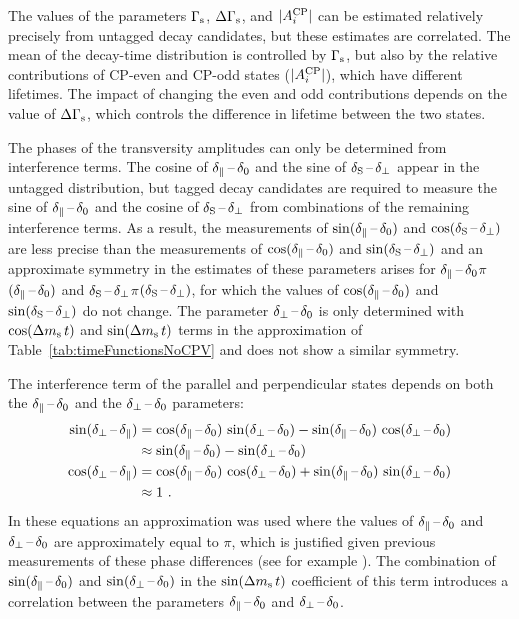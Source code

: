 The values of the parameters $\Gs$, $\DGs$, and $|\AAv|$ can be estimated relatively precisely from untagged decay candidates, but these
estimates are correlated. The mean of the decay-time distribution is controlled by $\Gs$, but also by the relative contributions of CP-even
and CP-odd states ($|\AAv|$), which have different lifetimes. The impact of changing the even and odd contributions depends on the value of
$\DGs$, which controls the difference in lifetime between the two states.

The phases of the transversity amplitudes can only be determined from interference terms. The cosine of $\delparzero$ and the sine of
$\delSperp$ appear in the untagged distribution, but tagged decay candidates are required to measure the sine of $\delparzero$ and the
cosine of $\delSperp$ from combinations of the remaining interference terms. As a result, the measurements of $\sin(\delparzero)$ and
$\cos(\delSperp)$ are less precise than the measurements of $\cos(\delparzero)$ and $\sin(\delSperp)$ and an approximate symmetry in the
estimates of these parameters arises for $\delparzero$$\pi$\textminus$(\delparzero)$ and
$\delSperp$\textto$\pi$\textminus$(\delSperp)$, for which the values of $\cos(\delparzero)$ and $\sin(\delSperp)$ do not change. The
parameter $\delperpzero$ is only determined with $\cDms$ and $\sDms$ terms in the approximation of Table~\ref{tab:timeFunctionsNoCPV} and
does not show a similar symmetry.

The interference term of the parallel and perpendicular states depends on both the $\delparzero$ and the $\delperpzero$ parameters:
\begin{subequations}
  \label{eq:parperpPhaseExp}
  \begin{align}
    \sin(\delperppar) &= \cos(\delparzero)\, \sin(\delperpzero) - \sin(\delparzero)\, \cos(\delperpzero) \nonumber\\
                      &\approx \sin(\delparzero) - \sin(\delperpzero)  \\
    \cos(\delperppar) &= \cos(\delparzero)\, \cos(\delperpzero) + \sin(\delparzero)\, \sin(\delperpzero) \nonumber\\
                      &\approx 1 \ .
  \end{align}
\end{subequations}
In these equations an approximation was used where the values of $\delparzero$ and $\delperpzero$ are approximately equal to $\pi$, which
is justified given previous measurements of these phase differences (see for example \cite{LHCb-PAPER-2013-002,*LHCb-ANA-2012-067}). The
combination of $\sin(\delparzero)$ and $\sin(\delperpzero)$ in the $\sDms$ coefficient of this term introduces a correlation between the
parameters $\delparzero$ and $\delperpzero$.


